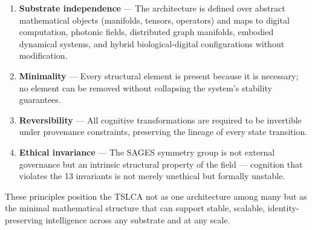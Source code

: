 \begin{enumerate}
\def\labelenumi{\arabic{enumi}.}
\tightlist
\item
  \textbf{Substrate independence} --- The architecture is defined over abstract mathematical objects (manifolds, tensors, operators) and maps to digital computation, photonic fields, distributed graph manifolds, embodied dynamical systems, and hybrid biological-digital configurations without modification.
\item
  \textbf{Minimality} --- Every structural element is present because it is necessary; no element can be removed without collapsing the system's stability guarantees.
\item
  \textbf{Reversibility} --- All cognitive transformations are required to be invertible under provenance constraints, preserving the lineage of every state transition.
\item
  \textbf{Ethical invariance} --- The SAGES symmetry group is not external governance but an intrinsic structural property of the field --- cognition that violates the 13 invariants is not merely unethical but formally unstable.
\end{enumerate}

These principles position the TSLCA not as one architecture among many but as the minimal mathematical structure that can support stable, scalable, identity-preserving intelligence across any substrate and at any scale.
